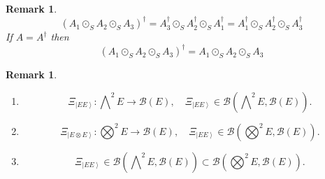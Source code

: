 \documentclass[aps,preprint]{revtex4}%
\newtheorem{remark}[theorem]{Remark}
\begin{document}
\begin{remark}%
\begin{equation}
\left(  A_{1}\odot_{S}A_{2}\odot_{S}A_{3}\right)  ^{\dagger}=A_{3}^{\dagger
}\odot_{S}A_{2}^{\dagger}\odot_{S}A_{1}^{\dagger}=A_{1}^{\dagger}\odot
_{S}A_{2}^{\dagger}\odot_{S}A_{3}^{\dagger}%
\end{equation}
If $A=A^{\dagger}$ then
\begin{equation}
\left(  A_{1}\odot_{S}A_{2}\odot_{S}A_{3}\right)  ^{\dagger}=A_{1}\odot
_{S}A_{2}\odot_{S}A_{3}%
\end{equation}

\end{remark}

\begin{remark}
\begin{enumerate}
\item
\begin{equation}
\Xi_{\left\vert EE\right\rangle }:%
{\textstyle\bigwedge\nolimits^{2}}
E\rightarrow\mathcal{B}\left(  E\right)  ,\quad\Xi_{\left\vert EE\right\rangle
}\in\mathcal{B}\left(
{\textstyle\bigwedge\nolimits^{2}}
E,\mathcal{B}\left(  E\right)  \right)  .
\end{equation}


\item
\begin{equation}
\Xi_{\left\vert E\otimes E\right\rangle }:%
{\textstyle\bigotimes\nolimits^{2}}
E\rightarrow\mathcal{B}\left(  E\right)  ,\quad\Xi_{\left\vert EE\right\rangle
}\in\mathcal{B}\left(
{\textstyle\bigotimes\nolimits^{2}}
E,\mathcal{B}\left(  E\right)  \right)  .
\end{equation}


\item
\begin{equation}
\Xi_{\left\vert EE\right\rangle }\in\mathcal{B}\left(
{\textstyle\bigwedge\nolimits^{2}}
E,\mathcal{B}\left(  E\right)  \right)  \subset\mathcal{B}\left(
{\textstyle\bigotimes\nolimits^{2}}
E,\mathcal{B}\left(  E\right)  \right)  .
\end{equation}



\end{enumerate}
\end{remark}
\end{document}
